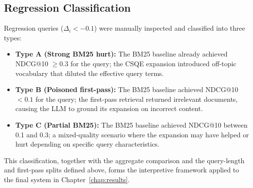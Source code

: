 \subsection{Regression Classification}
Regression queries ($\Delta_i < -0.1$) were manually inspected and classified into three types:

\begin{itemize}
    \item \textbf{Type A (Strong BM25 hurt):} The BM25 baseline already achieved NDCG@10 $\geq 0.3$ for the query; the CSQE expansion introduced off-topic vocabulary that diluted the effective query terms.
    \item \textbf{Type B (Poisoned first-pass):} The BM25 baseline achieved NDCG@10 $< 0.1$ for the query; the first-pass retrieval returned irrelevant documents, causing the LLM to ground its expansion on incorrect content.
    \item \textbf{Type C (Partial BM25):} The BM25 baseline achieved NDCG@10 between 0.1 and 0.3; a mixed-quality scenario where the expansion may have helped or hurt depending on specific query characteristics.
\end{itemize}

This classification, together with the aggregate comparison and the query-length and first-pass splits defined above, forms the interpretive framework applied to the final system in Chapter~\ref{chap:results}.

